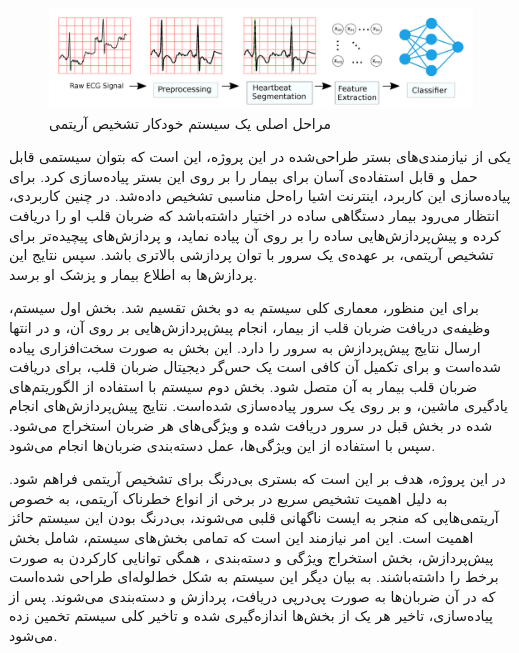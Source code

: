 \begin{figure}[!htb]
\centering
\includegraphics[width=15cm]{Figures/classifier.png}
\caption{مراحل اصلی یک سیستم خودکار تشخیص آریتمی\cite{Mondejar}}
\label{fig:classifierPicture}
\end{figure}

یکی از نیازمندی‌های بستر طراحی‌شده در این پروژه، این است که بتوان سیستمی قابل حمل و قابل استفاده‌ی آسان برای بیمار را بر روی این بستر پیاده‌سازی کرد. برای پیاده‌سازی این کاربرد، اینترنت اشیا راه‌حل مناسبی تشخیص داده‌شد. در چنین کاربردی، انتظار می‌رود بیمار دستگاهی ساده در اختیار داشته‌باشد که ضربان قلب او را دریافت کرده و پیش‌پردازش‌هایی ساده را بر روی آن پیاده نماید، و پردازش‌های پیچیده‌تر برای تشخیص آریتمی، بر عهده‌ی یک سرور با توان پردازشی بالاتری باشد. سپس نتایج این پردازش‌ها به اطلاع بیمار و پزشک او برسد.

 برای این منظور، معماری کلی سیستم به دو بخش تقسیم شد. بخش اول سیستم، وظیفه‌ی دریافت ضربان قلب از بیمار،‌ انجام پیش‌پردازش‌هایی  بر روی آن، و در انتها ارسال نتایج پیش‌پردازش به سرور را دارد. این بخش به صورت سخت‌افزاری پیاده شده‌است و برای تکمیل آن کافی است یک حس‌گر  دیجیتال ضربان قلب، برای دریافت ضربان قلب بیمار به آن متصل شود. 
بخش دوم سیستم با استفاده از الگوریتم‌های یادگیری ماشین، و بر روی یک سرور پیاده‌سازی شده‌است. نتایج پیش‌پردازش‌های انجام شده در بخش قبل در سرور دریافت شده و ویژگی‌های هر ضربان استخراج می‌شود. سپس با استفاده از این ویژگی‌ها، عمل دسته‌بندی ضربان‌ها انجام می‌شود.

در این پروژه، هدف بر این است که بستری بی‌درنگ برای تشخیص آریتمی فراهم شود. به دلیل اهمیت تشخیص سریع در برخی از انواع خطرناک آریتمی، به خصوص آریتمی‌هایی که منجر به ایست ناگهانی قلبی می‌شوند، بی‌درنگ بودن این سیستم حائز اهمیت است. این امر نیازمند این است که تمامی بخش‌های سیستم، شامل بخش پیش‌پردازش،‌ بخش استخراج ویژگی  و دسته‌بندی ، همگی توانایی کارکردن به صورت برخط  را داشته‌باشند. به بیان دیگر این سیستم به شکل خط‌لوله‌ای  طراحی شده‌است که در آن ضربان‌ها به صورت پی‌در‌پی دریافت، پردازش‌ و دسته‌بندی می‌شوند. پس از پیاده‌سازی، تاخیر هر یک از بخش‌ها اندازه‌گیری شده و تاخیر کلی سیستم تخمین زده می‌شود. 

